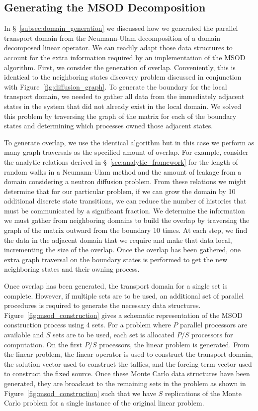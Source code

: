 \subsection{Generating the MSOD Decomposition }
\label{subsec:msod_generation}
In \S~\ref{subsec:domain_generation} we discussed how we generated the
parallel transport domain from the Neumann-Ulam decomposition of a
domain decomposed linear operator. We can readily adapt those data
structures to account for the extra information required by an
implementation of the MSOD algorithm. First, we consider the
generation of overlap. Conveniently, this is identical to the
neighboring states discovery problem discussed in conjunction with
Figure~\ref{fig:diffusion_graph}. To generate the boundary for the
local transport domain, we needed to gather all data from the
immediately adjacent states in the system that did not already exist
in the local domain. We solved this problem by traversing the graph
of the matrix for each of the boundary states and determining which
processes owned those adjacent states. 

To generate overlap, we use the identical algorithm but in this case
we perform as many graph traversals as the specified amount of
overlap. For example, consider the analytic relations derived in
\S~\ref{sec:analytic_framework} for the length of random walks in a
Neumann-Ulam method and the amount of leakage from a domain
considering a neutron diffusion problem. From these relations we might
determine that for our particular problem, if we can grow the domain
by 10 additional discrete state transitions, we can reduce the number
of histories that must be communicated by a significant fraction. We
determine the information we must gather from neighboring domains to
build the overlap by traversing the graph of the matrix outward from
the boundary 10 times. At each step, we find the data in the adjacent
domain that we require and make that data local, incrementing the size
of the overlap. Once the overlap has been gathered, one extra graph
traversal on the boundary states is performed to get the new
neighboring states and their owning process.

Once overlap has been generated, the transport domain for a single set
is complete. However, if multiple sets are to be used, an additional
set of parallel procedures is required to generate the necessary data
structures. Figure~\ref{fig:msod_construction} gives a schematic
representation of the MSOD construction process using 4 sets. For a
problem where $P$ parallel processors are available and $S$ sets are
to be used, each set is allocated $P/S$ processors for computation. On
the first $P/S$ processors, the linear problem is generated. From the
linear problem, the linear operator is used to construct the transport
domain, the solution vector used to construct the tallies, and the
forcing term vector used to construct the fixed source. Once these
Monte Carlo data structures have been generated, they are broadcast to
the remaining sets in the problem as shown in
Figure~\ref{fig:msod_construction} such that we have $S$ replications
of the Monte Carlo problem for a single instance of the original
linear problem.

